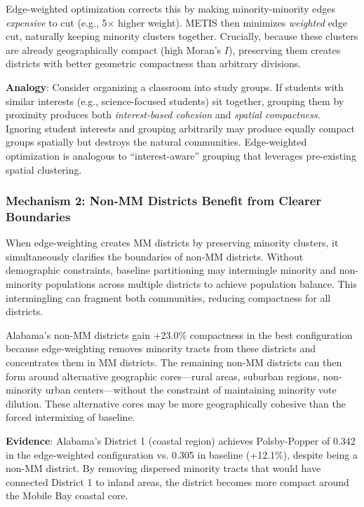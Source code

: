 Edge-weighted optimization corrects this by making minority-minority edges \emph{expensive} to cut (e.g., 5$\times$ higher weight). METIS then minimizes \emph{weighted} edge cut, naturally keeping minority clusters together. Crucially, because these clusters are already geographically compact (high Moran's $I$), preserving them creates districts with better geometric compactness than arbitrary divisions.

\textbf{Analogy}: Consider organizing a classroom into study groups. If students with similar interests (e.g., science-focused students) sit together, grouping them by proximity produces both \emph{interest-based cohesion} and \emph{spatial compactness}. Ignoring student interests and grouping arbitrarily may produce equally compact groups spatially but destroys the natural communities. Edge-weighted optimization is analogous to ``interest-aware'' grouping that leverages pre-existing spatial clustering.

\subsubsection{Mechanism 2: Non-MM Districts Benefit from Clearer Boundaries}

When edge-weighting creates MM districts by preserving minority clusters, it simultaneously clarifies the boundaries of non-MM districts. Without demographic constraints, baseline partitioning may intermingle minority and non-minority populations across multiple districts to achieve population balance. This intermingling can fragment both communities, reducing compactness for all districts.

Alabama's non-MM districts gain +23.0\% compactness in the best configuration because edge-weighting removes minority tracts from these districts and concentrates them in MM districts. The remaining non-MM districts can then form around alternative geographic cores---rural areas, suburban regions, non-minority urban centers---without the constraint of maintaining minority vote dilution. These alternative cores may be more geographically cohesive than the forced intermixing of baseline.

\textbf{Evidence}: Alabama's District 1 (coastal region) achieves Polsby-Popper of 0.342 in the edge-weighted configuration vs. 0.305 in baseline (+12.1\%), despite being a non-MM district. By removing dispersed minority tracts that would have connected District 1 to inland areas, the district becomes more compact around the Mobile Bay coastal core.

